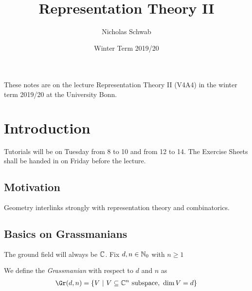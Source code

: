 \documentclass{skript}
\title{Representation Theory II}
\author{Nicholas Schwab}
\date{Winter Term 2019/20}
\begin{document}
\thispagestyle{plain}
These notes are on the lecture Representation Theory II (V4A4) in the winter term 2019/20 at the University Bonn.

\tableofcontents

\chapter{Introduction}

Tutorials will be on Tuesday from 8 to 10 and from 12 to 14.
The Exercise Sheets shall be handed in on Friday before the lecture.

\section*{Motivation}
Geometry interlinks strongly with representation theory and combinatorics.

\begin{figure}
    
\end{figure}

\section{Basics on Grassmanians}
The ground field will always be $\mathbb{C}$.
Fix $d,n\in \mathbb{N}_0$ with $n\geq 1$

\begin{definition}[Grassmanian]\label{def:grass}
    We define the \emph{Grassmanian} with respect to $d$ and $n$ as
    \begin{align*}
        \Gr(d,n) = \left\{V\such V\subseteq \IC^n \text{ subspace},~ \dim V = d\right\}
    \end{align*}
\end{definition}
\end{document}

